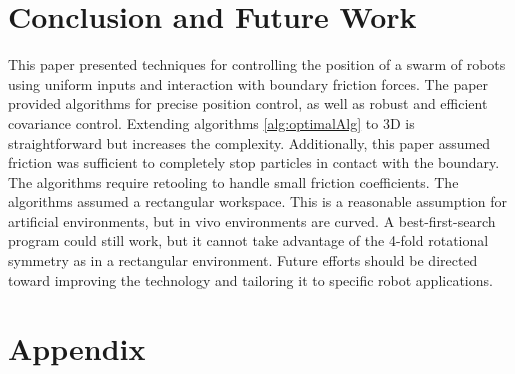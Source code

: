 \section{Conclusion and Future Work}\label{sec:conclusion}

This paper presented techniques for controlling the position of a swarm of robots using uniform inputs and interaction with boundary friction forces.  
The paper provided algorithms for precise position control, as well as robust and efficient covariance control. 
Extending algorithms \ref{alg:optimalAlg}  to 3D is straightforward but increases the complexity.
 Additionally, this paper assumed friction was sufficient to completely stop particles in contact with the boundary. 
  The algorithms require retooling to handle small friction coefficients. 
 The algorithms assumed a rectangular workspace.  This is a reasonable assumption for artificial environments, but in vivo environments are curved.  
 A best-first-search program could still work, but it cannot take advantage of the 4-fold rotational symmetry as in a rectangular environment.
Future efforts should be directed toward improving the technology and tailoring it to specific robot applications.



\section{Appendix}\label{sec:Appendix}


  
    



